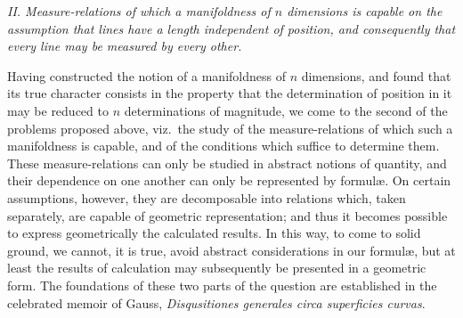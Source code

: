\documentclass[a4paper,12pt]{article}
\begin{document}
\begin{center}
\emph{II. Measure-relations of which a manifoldness of $n$
dimensions is capable on the assumption that lines have a length
independent of position, and consequently that every line may be
measured by every other.}
\end{center}

Having constructed the notion of a manifoldness of $n$
dimensions, and found that its true character consists in the
property that the determination of position in it may be reduced
to $n$ determinations of magnitude, we come to the second of the
problems proposed above, viz.\ the study of the measure-relations
of which such a manifoldness is capable, and of the conditions
which suffice to determine them.  These measure-relations can
only be studied in abstract notions of quantity, and their
dependence on one another can only be represented by formul{\ae}.
On certain assumptions, however, they are decomposable into
relations which, taken separately, are capable of geometric
representation; and thus it becomes possible to express
geometrically the calculated results.  In this way, to come to
solid ground, we cannot, it is true, avoid abstract
considerations in our formul{\ae}, but at least the results of
calculation may subsequently be presented in a geometric form.
The foundations of these two parts of the question are
established in the celebrated memoir of Gauss,
\emph{Disqusitiones generales circa superficies curvas}.

\bigbreak
\end{document}
